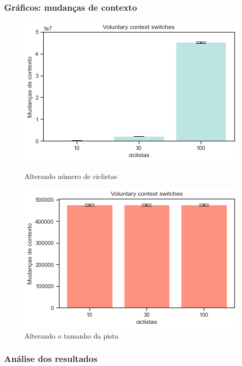 \documentclass{beamer}
\begin{document}
\begin{frame}
\frametitle{Gráficos: mudanças de contexto}
\begin{figure}[!htb]

%
  \includegraphics[width=\linewidth]{imgs/ciclistas_contexto}
  \caption{Alterando número de ciclistas}\label{fig:awesome_image3}
\endminipage
{}%
  \includegraphics[width=\linewidth]{imgs/pistas_contexto}
  \caption{Alterando o tamanho da pista}\label{fig:awesome_image3}
\endminipage
\end{figure}

\end{frame}



\begin{frame}
\frametitle{Análise dos resultados}


\end{frame}
\end{document}
